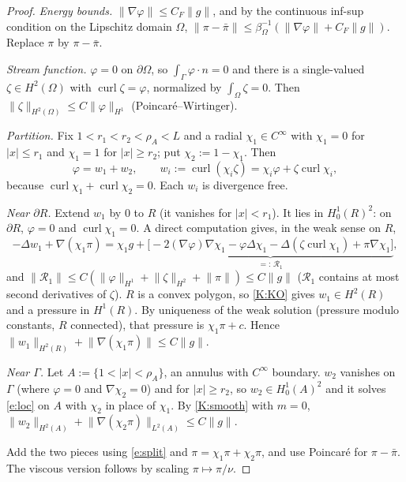\documentclass[11pt,reqno]{amsart}
\theoremstyle{plain}
\theoremstyle{definition}
\newcommand{\norm}[1]{\lVert #1\rVert}
\newcommand{\curl}{\operatorname{curl}}
\begin{document}
\begin{proof}
\emph{Energy bounds.} $\norm{\nabla\varphi}\le C_F\norm g$, and by the continuous inf-sup condition on the Lipschitz domain $\Omega$, $\norm{\pi-\bar\pi}\le\beta_\Omega^{-1}(\norm{\nabla\varphi}+C_F\norm g)$. Replace $\pi$ by $\pi-\bar\pi$.

\emph{Stream function.} $\varphi=0$ on $\partial\Omega$, so $\int_\Gamma\varphi\cdot n=0$ and there is a single-valued $\zeta\in H^2(\Omega)$ with $\curl\zeta=\varphi$, normalized by $\int_\Omega\zeta=0$. Then $\norm\zeta_{H^2(\Omega)}\le C\norm\varphi_{H^1}$ (Poincar\'e--Wirtinger).

\emph{Partition.} Fix $1<r_1<r_2<\rho_A<L$ and a radial $\chi_1\in C^\infty$ with $\chi_1=0$ for $|x|\le r_1$ and $\chi_1=1$ for $|x|\ge r_2$; put $\chi_2:=1-\chi_1$. Then
\begin{equation}\label{e:split}
\varphi=w_1+w_2,\qquad w_i:=\curl(\chi_i\zeta)=\chi_i\varphi+\zeta\curl\chi_i ,
\end{equation}
because $\curl\chi_1+\curl\chi_2=0$. Each $w_i$ is divergence free.

\emph{Near $\partial R$.} Extend $w_1$ by $0$ to $R$ (it vanishes for $|x|<r_1$). It lies in $H^1_0(R)^2$: on $\partial R$, $\varphi=0$ and $\curl\chi_1=0$. A direct computation gives, in the weak sense on $R$,
\begin{equation}\label{e:loc}
-\Delta w_1+\nabla(\chi_1\pi)=\chi_1g+\underbrace{\bigl[-2(\nabla\varphi)\nabla\chi_1-\varphi\Delta\chi_1-\Delta(\zeta\curl\chi_1)+\pi\nabla\chi_1\bigr]}_{=:\,\mathcal R_1},
\end{equation}
and $\norm{\mathcal R_1}\le C(\norm\varphi_{H^1}+\norm\zeta_{H^2}+\norm\pi)\le C\norm g$ ($\mathcal R_1$ contains at most second derivatives of $\zeta$). $R$ is a convex polygon, so \ref{K:KO} gives $w_1\in H^2(R)$ and a pressure in $H^1(R)$. By uniqueness of the weak solution (pressure modulo constants, $R$ connected), that pressure is $\chi_1\pi+c$. Hence $\norm{w_1}_{H^2(R)}+\norm{\nabla(\chi_1\pi)}\le C\norm g$.

\emph{Near $\Gamma$.} Let $A:=\{1<|x|<\rho_A\}$, an annulus with $C^\infty$ boundary. $w_2$ vanishes on $\Gamma$ (where $\varphi=0$ and $\nabla\chi_2=0$) and for $|x|\ge r_2$, so $w_2\in H^1_0(A)^2$ and it solves \eqref{e:loc} on $A$ with $\chi_2$ in place of $\chi_1$. By \ref{K:smooth} with $m=0$, $\norm{w_2}_{H^2(A)}+\norm{\nabla(\chi_2\pi)}_{L^2(A)}\le C\norm g$.

Add the two pieces using \eqref{e:split} and $\pi=\chi_1\pi+\chi_2\pi$, and use Poincar\'e for $\pi-\bar\pi$. The viscous version follows by scaling $\pi\mapsto\pi/\nu$.
\end{proof}
\end{document}
